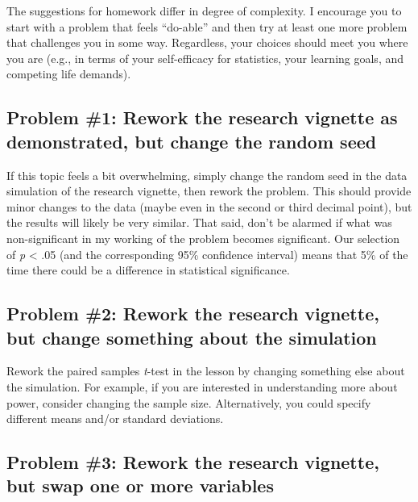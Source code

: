 \documentclass[
  11pt,
]{book}
\begin{document}
The suggestions for homework differ in degree of complexity. I encourage you to start with a problem that feels ``do-able'' and then try at least one more problem that challenges you in some way. Regardless, your choices should meet you where you are (e.g., in terms of your self-efficacy for statistics, your learning goals, and competing life demands).

\hypertarget{problem-1-rework-the-research-vignette-as-demonstrated-but-change-the-random-seed-2}{%
\subsection{Problem \#1: Rework the research vignette as demonstrated, but change the random seed}\label{problem-1-rework-the-research-vignette-as-demonstrated-but-change-the-random-seed-2}}

If this topic feels a bit overwhelming, simply change the random seed in the data simulation of the research vignette, then rework the problem. This should provide minor changes to the data (maybe even in the second or third decimal point), but the results will likely be very similar. That said, don't be alarmed if what was non-significant in my working of the problem becomes significant. Our selection of \emph{p} \textless{} .05 (and the corresponding 95\% confidence interval) means that 5\% of the time there could be a difference in statistical significance.

\hypertarget{problem-2-rework-the-research-vignette-but-change-something-about-the-simulation-2}{%
\subsection{Problem \#2: Rework the research vignette, but change something about the simulation}\label{problem-2-rework-the-research-vignette-but-change-something-about-the-simulation-2}}

Rework the paired samples \emph{t}-test in the lesson by changing something else about the simulation. For example, if you are interested in understanding more about power, consider changing the sample size. Alternatively, you could specify different means and/or standard deviations.

\hypertarget{problem-3-rework-the-research-vignette-but-swap-one-or-more-variables-1}{%
\subsection{Problem \#3: Rework the research vignette, but swap one or more variables}\label{problem-3-rework-the-research-vignette-but-swap-one-or-more-variables-1}}
\end{document}
